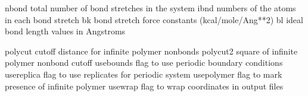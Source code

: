 \documentclass[letterpaper,11pt,english]{sphinxmanual}
\begin{document}
\sphinxAtStartPar
{}

\begin{sphinxVerbatim}[commandchars=\\\{\}]
nbond           total number of bond stretches in the system
ibnd            numbers of the atoms in each bond stretch
bk              bond stretch force constants (kcal/mole/Ang**2)
bl              ideal bond length values in Angstroms
\end{sphinxVerbatim}

\sphinxAtStartPar
{}

\begin{sphinxVerbatim}[commandchars=\\\{\}]
polycut         cutoff distance for infinite polymer nonbonds
polycut2        square of infinite polymer nonbond cutoff
use\PYGZus{}bounds      flag to use periodic boundary conditions
use\PYGZus{}replica     flag to use replicates for periodic system
use\PYGZus{}polymer     flag to mark presence of infinite polymer
use\PYGZus{}wrap        flag to wrap coordinates in output files
\end{sphinxVerbatim}

\sphinxAtStartPar
{}
\end{document}
